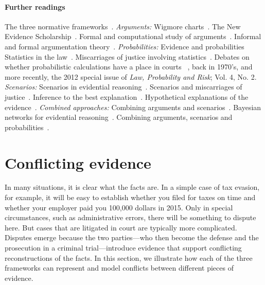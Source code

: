 \documentclass[10pt]{article}
\begin{document}

\paragraph{Further readings} 
The three normative frameworks~\citep{andersonEtal2005,kapteinEtal2009,dawidEtal2011}. 
%
\textit{Arguments:} Wigmore charts~\citep{wigmore1913,wigmore1931}. The New Evidence Scholarship~\citep{andersonEtal2005}. 
Formal and computational study of arguments~\citep{pollock1987,pollock1995}.
Informal and formal argumentation theory~\citep{vanEemerenEtal2014}.
%
\textit{Probabilities:}
Evidence and probabilities~\cite{schum1994,morteraDawid2007}
Statistics in the law~\citep{fenton2011}. Miscarriages of justice involving statistics~\citep{dawidEtal2011,schnepsColmez2013}.
Debates on whether probabilistic calculations have a place in courts ~\citet{finkelsteinFairley1970,tribe1971}, back in 
1970's, and more recently, the 2012 special issue of \textit{Law, Probability and Risk}; Vol. 4, No. 2. 
%
\textit{Scenarios:}
Scenarios in evidential reasoning~\citep{bennettFeldman1981,penningtonHastie1993,penningtonHastie1993StoryModel}. Scenarios and miscarriages of justice~\citep{wagenaarEtal1993}. Inference to the best explanation~\citep{pardoAllen2008}. Hypothetical explanations of the evidence~\citep{thagard1989}. 
%
\textit{Combined approaches:}
Combining arguments and scenarios~\citep{bexEtal2010,bex2011}. Bayesian networks for evidential reasoning~\citep{heplerEtal2007,fentonNeilLagnado2013}. Combining arguments, scenarios and probabilities~\citep{vlekEtal2014, timmerEtAl2015ecsqaru, verheijEtal2016,verheij2014}.  

\section{Conflicting evidence}
\label{sec:conf}
 	

In many situations, it is clear what the facts are. In a simple case of tax evasion, for example, 
it will be easy to establish whether you filed for taxes on time and whether your employer paid you 100,000 dollars in 2015. Only in special circumstances, 
such as administrative errors, there will be something to dispute here. 
But cases that are litigated in court are typically more complicated.
Disputes emerge because the two parties---who then become the defense and the 
prosecution in a criminal trial---introduce evidence that support conflicting 
reconstructions of the facts. In this section, we illustrate how 
each of the three frameworks can represent and model conflicts 
between different pieces of evidence. 
\end{document}
